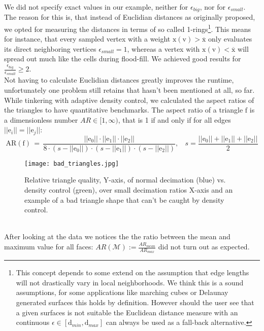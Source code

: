 We did not specify exact values in our example, neither for $\epsilon_{big}$, nor for $\epsilon_{small}$.
The reason for this is, that instead of Euclidian distances as originally proposed, we opted for measuring the distances in terms of so called 1-rings\footnote{ This concept depends to some extend on the assumption that edge lengths will not drastically vary in local neighborhoods. We think this is a sound assumptions, for some applications like marching cubes or Delaunay generated surfaces this holds by definition. However should the user see that a given surfaces is not suitable the Euclidean distance measure with an continuous $\epsilon \in [\mathrm{d}_{min}, \mathrm{d}_{max}]$ can always be used as a fall-back alternative.}.
This means for instance, that every sampled vertex with a weight $\mathrm{x}(\mathrm{v}) > \overline{\mathrm{x}}$ only evaluates its direct neighboring vertices $\epsilon_{small} = 1$, whereas a vertex with $\mathrm{x}(\mathrm{v}) < \overline{\mathrm{x}}$ will spread out much like the cells during flood-fill.
We achieved good results for $\frac{\epsilon_{big}}{\epsilon_{small}} \geq 2$.\\
Not having to calculate Euclidian distances greatly improves the runtime, unfortunately one problem still retains that hasn't been mentioned at all, so far.
While tinkering with adaptive density control, we calculated the aspect ratios of the triangles to have quantitative benchmarks.
The aspect ratio of a triangle $\mathrm{f}$ is a dimensionless number $AR \in [1, \infty)$, that is 1 if and only if for all edges $||\mathrm{e}_{i}|| = ||\mathrm{e}_{j}||$:
\begin{equation} \label{eq:aspect_ratio}
\mathrm{AR}(\mathrm{f}) \,=\, \frac{||\mathrm{e}_{0}|| \cdot ||\mathrm{e}_{1}|| \cdot ||\mathrm{e}_{2}||}{8 \cdot (s-||\mathrm{e}_{0}||) \cdot (s-||\mathrm{e}_{1}||) \cdot (s-||\mathrm{e}_{2}||)}, ~~~~ s = \frac{||\mathrm{e}_{0}|| + ||\mathrm{e}_{1}|| + ||\mathrm{e}_{2}||}{2}
\end{equation}
\vspace{-0.75cm}
\begin{figure}[ht]
\centering
\texttt{[image: bad\_triangles.jpg]}
\caption{Relative triangle quality, Y-axis, of normal decimation (blue) vs. density control (green), over small decimation ratios X-axis and an example of a bad triangle shape that can't be caught by density control.}
\label{fig:bad_triangles}
\end{figure}\\
After looking at the data we notices the the ratio between the mean and maximum value for all faces: $AR(\mathcal{M}) := \frac{AR_{mean}}{AR_{max}}$ did not turn out as expected.
